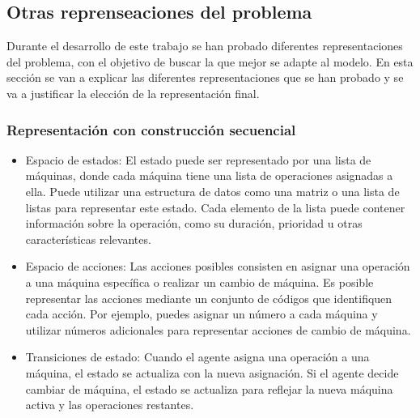 \subsection{Otras reprenseaciones del problema}
Durante el desarrollo de este trabajo se han probado diferentes representaciones
del problema, con el objetivo de buscar la que mejor se adapte al modelo. En
esta sección se van a explicar las diferentes representaciones que se han probado
y se va a justificar la elección de la representación final.\medskip

\subsubsection{Representación con construcción secuencial}
\begin{itemize}
    \item Espacio de estados: El estado puede ser representado por una 
    lista de máquinas, donde cada máquina tiene una lista de operaciones asignadas
    a ella. Puede utilizar una estructura de datos como una matriz o una lista de
    listas para representar este estado. Cada elemento de la lista puede contener 
    información sobre la operación, como su duración, prioridad u otras características 
    relevantes.
    \item Espacio de acciones: Las acciones posibles consisten en asignar una operación 
    a una máquina específica o realizar un cambio de máquina. Es posible representar las acciones 
    mediante un conjunto de códigos que identifiquen cada acción. Por ejemplo, puedes asignar 
    un número a cada máquina y utilizar números adicionales para representar acciones 
    de cambio de máquina.
    \item Transiciones de estado: Cuando el agente asigna una operación a una máquina, 
    el estado se actualiza con la nueva asignación. Si el agente decide cambiar de máquina, 
    el estado se actualiza para reflejar la nueva máquina activa y las operaciones restantes.
\end{itemize}

